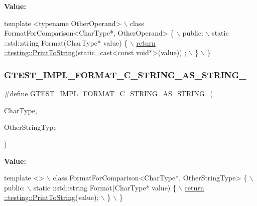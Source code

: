 {\bfseries Value\+:}
\begin{DoxyCode}
\textcolor{keyword}{template} <\textcolor{keyword}{typename} OtherOperand>                                      \(\backslash\)
  class FormatForComparison<CharType*, OtherOperand> \{                  \(\backslash\)
   public:                                                              \(\backslash\)
    static ::std::string Format(CharType* value) \{                      \hyperlink{namespacetesting_aa5717bb1144edd1d262d310ba70c82ed}{\(\backslash\)}
\hyperlink{namespacetesting_aa5717bb1144edd1d262d310ba70c82ed}{      return ::testing::PrintToString}(static\_cast<const void*>(value))
      ; \(\backslash\)
    \}                                                                   \(\backslash\)
  \}
\end{DoxyCode}
\mbox{\label{gtest-printers_8h_ad6102ed2a0571d5196e606a061c16a10}} 
\subsubsection{\texorpdfstring{G\+T\+E\+S\+T\+\_\+\+I\+M\+P\+L\+\_\+\+F\+O\+R\+M\+A\+T\+\_\+\+C\+\_\+\+S\+T\+R\+I\+N\+G\+\_\+\+A\+S\+\_\+\+S\+T\+R\+I\+N\+G\+\_\+}{GTEST\_IMPL\_FORMAT\_C\_STRING\_AS\_STRING\_}}
{\footnotesize\ttfamily \#define G\+T\+E\+S\+T\+\_\+\+I\+M\+P\+L\+\_\+\+F\+O\+R\+M\+A\+T\+\_\+\+C\+\_\+\+S\+T\+R\+I\+N\+G\+\_\+\+A\+S\+\_\+\+S\+T\+R\+I\+N\+G\+\_\+(\begin{DoxyParamCaption}\item[{}]{Char\+Type,  }\item[{}]{Other\+String\+Type }\end{DoxyParamCaption})}

{\bfseries Value\+:}
\begin{DoxyCode}
\textcolor{keyword}{template} <>                                                           \(\backslash\)
  class FormatForComparison<CharType*, OtherStringType> \{               \(\backslash\)
   public:                                                              \(\backslash\)
    static ::std::string Format(CharType* value) \{                      \hyperlink{namespacetesting_aa5717bb1144edd1d262d310ba70c82ed}{\(\backslash\)}
\hyperlink{namespacetesting_aa5717bb1144edd1d262d310ba70c82ed}{      return ::testing::PrintToString}(value);                         
        \(\backslash\)
    \}                                                                   \(\backslash\)
  \}
\end{DoxyCode}
